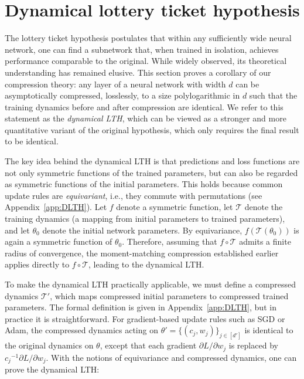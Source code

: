\documentclass{article}
\theoremstyle{plain}
\begin{document}
\vspace{-2mm}
\section{Dynamical lottery ticket hypothesis}\label{sec:LTH}
\vspace{-1mm}

The lottery ticket hypothesis \citep{frankle2018lottery} postulates that within any sufficiently wide neural network, one can find a subnetwork that, when trained in isolation, achieves performance comparable to the original. While widely observed, its theoretical understanding has remained elusive. This section proves a corollary of our compression theory: any layer of a neural network with width $d$ can be asymptotically compressed, losslessly, to a size polylogarithmic in $d$ such that the training dynamics before and after compression are identical. We refer to this statement as the \emph{dynamical LTH}, which can be viewed as a stronger and more quantitative variant of the original hypothesis, which only requires the final result to be identical.

The key idea behind the dynamical LTH is that predictions and loss functions are not only symmetric functions of the trained parameters, but can also be regarded as symmetric functions of the initial parameters. This holds because common update rules are \emph{equivariant}, i.e., they commute with permutations (see Appendix~\ref{app:DLTH}). Let $f$ denote a symmetric function, let $\mathcal{T}$ denote the training dynamics (a mapping from initial parameters to trained parameters), and let $\theta_0$ denote the initial network parameters. By equivariance, $f(\mathcal{T}(\theta_0))$ is again a symmetric function of $\theta_0$. Therefore, assuming that $f \circ \mathcal{T}$ admits a finite radius of convergence, the moment-matching compression established earlier applies directly to $f \circ \mathcal{T}$, leading to the dynamical LTH.

To make the dynamical LTH practically applicable, we must define a compressed dynamics $\mathcal{T}'$, which maps compressed initial parameters to compressed trained parameters. The formal definition is given in Appendix~\ref{app:DLTH}, but in practice it is straightforward. For gradient-based update rules such as SGD or Adam, the compressed dynamics acting on $\theta' = \{(c_j, w_j)\}_{j \in [d']}$ is identical to the original dynamics on $\theta$, except that each gradient $\partial L / \partial w_j$ is replaced by ${c_j}^{-1} \partial L / \partial w_j$. With the notions of equivariance and compressed dynamics, one can prove the dynamical LTH:
\end{document}

